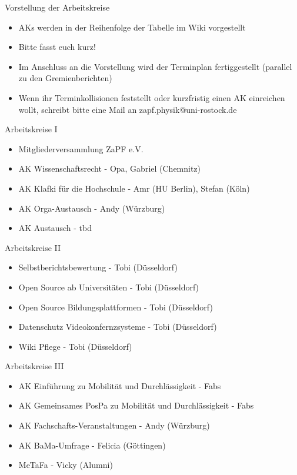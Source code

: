 \begin{frame}{Vorstellung der Arbeitskreise}
	\begin{itemize}
		\item AKs werden in der Reihenfolge der Tabelle im Wiki vorgestellt
		\item Bitte fasst euch kurz!
		\item Im Anschluss an die Vorstellung wird der Terminplan fertiggestellt (parallel zu den Gremienberichten)
		\item Wenn ihr Terminkollisionen feststellt oder kurzfristig einen AK einreichen wollt, schreibt bitte eine Mail an zapf.physik@uni-rostock.de
	\end{itemize}
\end{frame}

\begin{frame}{Arbeitskreise I}
	\begin{itemize}
		\item Mitgliederversammlung ZaPF e.V.
		\item AK Wissenschaftsrecht - Opa, Gabriel (Chemnitz)
		\item AK Klafki für die Hochschule - Amr (HU Berlin), Stefan (Köln)
		\item AK Orga-Austausch - Andy (Würzburg)
		\item AK Austausch - tbd
	\end{itemize}
\end{frame}

\begin{frame}{Arbeitskreise II}
	\begin{itemize}
		\item Selbstberichtsbewertung - Tobi (Düsseldorf)
		\item Open Source ab Universitäten - Tobi (Düsseldorf)
		\item Open Source Bildungsplattformen - Tobi (Düsseldorf)
		\item Datenschutz Videokonfernzsysteme - Tobi (Düsseldorf)
		\item Wiki Pflege - Tobi (Düsseldorf)
	\end{itemize}
\end{frame}

\begin{frame}{Arbeitskreise III}
	\begin{itemize}
		\item AK Einführung zu Mobilität und Durchlässigkeit - Fabs
		\item AK Gemeinsames PosPa zu Mobilität und Durchlässigkeit -  Fabs
		\item AK Fachschafts-Veranstaltungen - Andy (Würzburg)
		\item AK BaMa-Umfrage - Felicia (Göttingen)
		\item MeTaFa - Vicky (Alumni)
	\end{itemize}
\end{frame}

